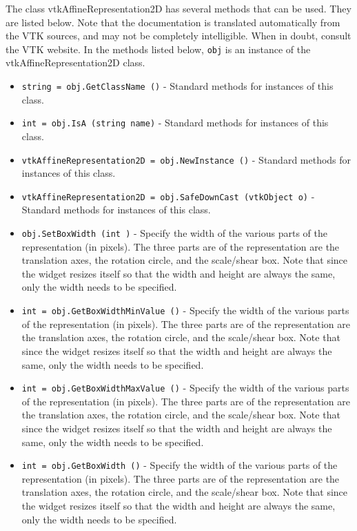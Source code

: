 The class vtkAffineRepresentation2D has several methods that can be used.
  They are listed below.
Note that the documentation is translated automatically from the VTK sources,
and may not be completely intelligible.  When in doubt, consult the VTK website.
In the methods listed below, \verb|obj| is an instance of the vtkAffineRepresentation2D class.
\begin{itemize}
\item  \verb|string = obj.GetClassName ()| -  Standard methods for instances of this class.

\item  \verb|int = obj.IsA (string name)| -  Standard methods for instances of this class.

\item  \verb|vtkAffineRepresentation2D = obj.NewInstance ()| -  Standard methods for instances of this class.

\item  \verb|vtkAffineRepresentation2D = obj.SafeDownCast (vtkObject o)| -  Standard methods for instances of this class.

\item  \verb|obj.SetBoxWidth (int )| -  Specify the width of the various parts of the representation (in
 pixels).  The three parts are of the representation are the translation
 axes, the rotation circle, and the scale/shear box. Note that since the
 widget resizes itself so that the width and height are always the
 same, only the width needs to be specified.

\item  \verb|int = obj.GetBoxWidthMinValue ()| -  Specify the width of the various parts of the representation (in
 pixels).  The three parts are of the representation are the translation
 axes, the rotation circle, and the scale/shear box. Note that since the
 widget resizes itself so that the width and height are always the
 same, only the width needs to be specified.

\item  \verb|int = obj.GetBoxWidthMaxValue ()| -  Specify the width of the various parts of the representation (in
 pixels).  The three parts are of the representation are the translation
 axes, the rotation circle, and the scale/shear box. Note that since the
 widget resizes itself so that the width and height are always the
 same, only the width needs to be specified.

\item  \verb|int = obj.GetBoxWidth ()| -  Specify the width of the various parts of the representation (in
 pixels).  The three parts are of the representation are the translation
 axes, the rotation circle, and the scale/shear box. Note that since the
 widget resizes itself so that the width and height are always the
 same, only the width needs to be specified.


\end{itemize}
